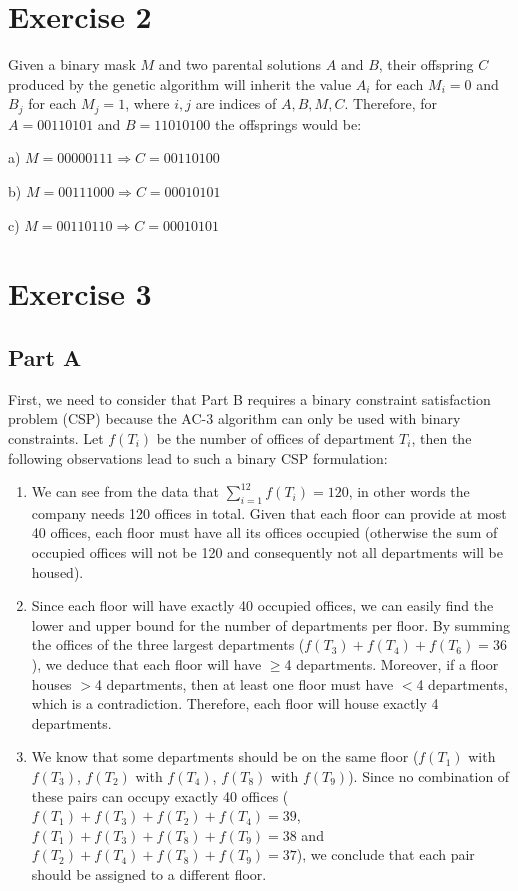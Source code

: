\section*{Exercise 2}

Given a binary mask $M$ and two parental solutions $A$ and $B$, their offspring $C$ produced by the genetic algorithm will inherit the value $A_i$ for each $M_i = 0$ and $B_j$ for each $M_j = 1$, where $i,j$ are indices of $A, B, M, C$. Therefore, for $A=00110101$ and $B=11010100$ the offsprings would be:

a) $ M=00000111 \Rightarrow C =  00110100$

b) $ M=00111000 \Rightarrow C = 00010101$

c) $ M=00110110 \Rightarrow C = 00010101$

\section*{Exercise 3}

\subsection*{Part A}

First, we need to consider that Part B requires a binary constraint satisfaction problem (CSP) because the AC-3 algorithm can only be used with binary constraints. Let $f(T_i)$ be the number of offices of department $T_i$, then the following observations lead to such a binary CSP formulation:

\begin{enumerate}

\item We can see from the data that $\sum_{i=1}^{12} f(T_i)=120$, in other words the company needs 120 offices in total. Given that each floor can provide at most 40 offices, each floor must have all its offices occupied (otherwise the sum of occupied offices will not be 120 and consequently not all departments will be housed).

\item Since each floor will have exactly 40 occupied offices, we can easily find the lower and upper bound for the number of departments per floor. By summing the offices of the three largest departments ($f(T_3)+f(T_4)+f(T_6)=36$), we deduce that each floor will have $\ge$4 departments. Moreover, if a floor houses $>$4 departments, then at least one floor must have $<$4 departments, which is a contradiction. Therefore, each floor will house exactly 4 departments.

\item We know that some departments should be on the same floor ($f(T_1)$ with $f(T_3)$, $f(T_2)$ with $f(T_4)$, $f(T_8)$ with $f(T_9)$). Since no combination of these pairs can occupy exactly 40 offices ($f(T_1)+f(T_3)+f(T_2)+f(T_4) = 39$, $f(T_1)+f(T_3)+f(T_8)+f(T_9) = 38$ and $f(T_2)+f(T_4)+f(T_8)+f(T_9) = 37$), we conclude that each pair should be assigned to a different floor.

\end{enumerate}

